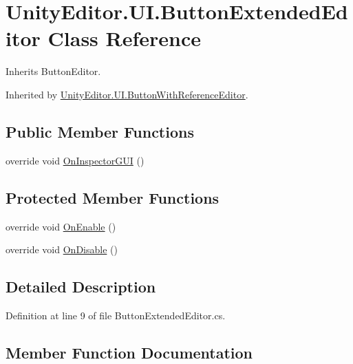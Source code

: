 \hypertarget{class_unity_editor_1_1_u_i_1_1_button_extended_editor}{}\section{Unity\+Editor.\+U\+I.\+Button\+Extended\+Editor Class Reference}
\label{class_unity_editor_1_1_u_i_1_1_button_extended_editor}


Inherits Button\+Editor.



Inherited by \hyperlink{class_unity_editor_1_1_u_i_1_1_button_with_reference_editor}{Unity\+Editor.\+U\+I.\+Button\+With\+Reference\+Editor}.

\subsection*{Public Member Functions}
\begin{DoxyCompactItemize}
\item 
override void \hyperlink{class_unity_editor_1_1_u_i_1_1_button_extended_editor_a934db4c0ff71beb61a9ac88352334592}{On\+Inspector\+G\+U\+I} ()
\end{DoxyCompactItemize}
\subsection*{Protected Member Functions}
\begin{DoxyCompactItemize}
\item 
override void \hyperlink{class_unity_editor_1_1_u_i_1_1_button_extended_editor_a862cf2d03097d61433a4e0e27ceda075}{On\+Enable} ()
\item 
override void \hyperlink{class_unity_editor_1_1_u_i_1_1_button_extended_editor_ae8f0cb734df01fb6595f450c9add1ec6}{On\+Disable} ()
\end{DoxyCompactItemize}


\subsection{Detailed Description}


Definition at line 9 of file Button\+Extended\+Editor.\+cs.



\subsection{Member Function Documentation}
\hypertarget{class_unity_editor_1_1_u_i_1_1_button_extended_editor_ae8f0cb734df01fb6595f450c9add1ec6}{}
